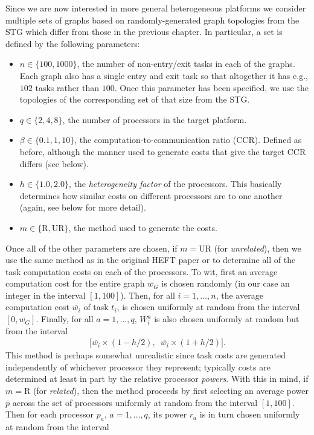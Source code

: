 \documentclass[12pt]{article}
\begin{document}
Since we are now interested in more general heterogeneous platforms we consider multiple sets of graphs based on randomly-generated graph topologies from the STG which differ from those in the previous chapter. In particular, a set is defined by the following parameters:
\begin{itemize}
	\item $n \in \{ 100, 1000 \}$, the number of non-entry/exit tasks in each of the graphs. Each graph also has a single entry and exit task so that altogether it has e.g., $102$ tasks rather than $100$. Once this parameter has been specified, we use the topologies of the corresponding set of that size from the STG. 
	\item $q \in \{2, 4, 8\}$, the number of processors in the target platform. 
	\item $\beta \in \{0.1, 1, 10\}$, the computation-to-communication ratio (CCR). Defined as before, although the manner used to generate costs that give the target CCR differs (see below).
	\item $h \in \{1.0, 2.0\}$, the {\em heterogeneity factor} of the processors. This basically determines how similar costs on different processors are to one another (again, see below for more detail).  
	\item $m \in \{\text{R}, \text{UR} \}$, the method used to generate the costs.
\end{itemize}
Once all of the other parameters are chosen, if $m = \text{UR}$ (for {\em unrelated}), then we use the same method as in the original HEFT paper \cite{topcuoglu2002performance} or \cite{arabnejad14} to determine all of the task computation costs on each of the processors. To wit, first an average computation cost for the entire graph $\overline{w_G}$ is chosen randomly (in our case an integer in the interval $[1, 100]$). Then, for all $i = 1, \dots, n$, the average computation cost $\overline{w_i}$ of task $t_i$, is chosen uniformly at random from the interval $[0, \overline{w_G}]$. Finally, for all $a = 1, \dots, q$, $W_i^a$ is also chosen uniformly at random but from the interval  
\begin{align*}
\big[ \overline{w_i} \times (1 - h/2), \enspace \overline{w_i} \times (1 + h/2)     \big].
\end{align*}
This method is perhaps somewhat unrealistic since task costs are generated independently of whichever processor they represent; typically costs are determined at least in part by the relative processor {\em powers}. With this in mind, if $m = \text{R}$ (for {\em related}), then the method proceeds by first selecting an average power $\overline{p}$ across the set of processors uniformly at random from the interval $[1, 100]$. Then for each processor $p_a$, $a = 1, \dots, q$, its power $r_a$ is in turn chosen uniformly at random from the interval
\end{document}
